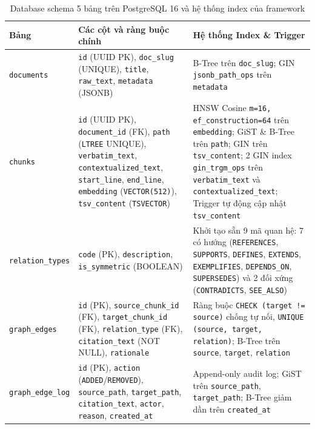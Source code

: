 \begin{table}[H]
\centering
\caption{Database schema 5 bảng trên PostgreSQL 16 và hệ thống index của framework}
\label{tab:db_schema}
\small\setlength{\tabcolsep}{4.5pt}\begin{tabularx}{\textwidth}{l>{\raggedright\arraybackslash}p{4.3cm}>{\raggedright\arraybackslash}X}
\toprule
\textbf{Bảng} & \textbf{Các cột và ràng buộc chính} & \textbf{Hệ thống Index \& Trigger} \\
\midrule
\texttt{documents} & \texttt{id} (UUID PK), \texttt{doc\_slug} (UNIQUE), \texttt{title}, \texttt{raw\_text}, \texttt{metadata} (JSONB) & B-Tree trên \texttt{doc\_slug}; GIN \texttt{jsonb\_path\_ops} trên \texttt{metadata} \\
\addlinespace[3pt]
\texttt{chunks} & \texttt{id} (UUID PK), \texttt{document\_id} (FK), \texttt{path} (\texttt{LTREE} UNIQUE), \texttt{verbatim\_text}, \texttt{contextualized\_text}, \texttt{start\_line}, \texttt{end\_line}, \texttt{embedding} (\texttt{VECTOR(512)}), \texttt{tsv\_content} (\texttt{TSVECTOR}) & HNSW Cosine \texttt{m=16, ef\_construction=64} trên \texttt{embedding}; GiST \& B-Tree trên \texttt{path}; GIN trên \texttt{tsv\_content}; 2 GIN index \texttt{gin\_trgm\_ops} trên \texttt{verbatim\_text} và \texttt{contextualized\_text}; Trigger tự động cập nhật \texttt{tsv\_content} \\
\addlinespace[3pt]
\texttt{relation\_types} & \texttt{code} (PK), \texttt{description}, \texttt{is\_symmetric} (BOOLEAN) & Khởi tạo sẵn 9 mã quan hệ: 7 có hướng (\texttt{REFERENCES}, \texttt{SUPPORTS}, \texttt{DEFINES}, \texttt{EXTENDS}, \texttt{EXEMPLIFIES}, \texttt{DEPENDS\_ON}, \texttt{SUPERSEDES}) và 2 đối xứng (\texttt{CONTRADICTS}, \texttt{SEE\_ALSO}) \\
\addlinespace[3pt]
\texttt{graph\_edges} & \texttt{id} (PK), \texttt{source\_chunk\_id} (FK), \texttt{target\_chunk\_id} (FK), \texttt{relation\_type} (FK), \texttt{citation\_text} (NOT NULL), \texttt{rationale} & Ràng buộc \texttt{CHECK (target != source)} chống tự nối, \texttt{UNIQUE (source, target, relation)}; B-Tree trên \texttt{source}, \texttt{target}, \texttt{relation} \\
\addlinespace[3pt]
\texttt{graph\_edge\_log} & \texttt{id} (PK), \texttt{action} (\texttt{ADDED}/\texttt{REMOVED}), \texttt{source\_path}, \texttt{target\_path}, \texttt{citation\_text}, \texttt{actor}, \texttt{reason}, \texttt{created\_at} & Append-only audit log; GiST trên \texttt{source\_path}, \texttt{target\_path}; B-Tree giảm dần trên \texttt{created\_at} \\
\bottomrule
\end{tabularx}
\end{table}

